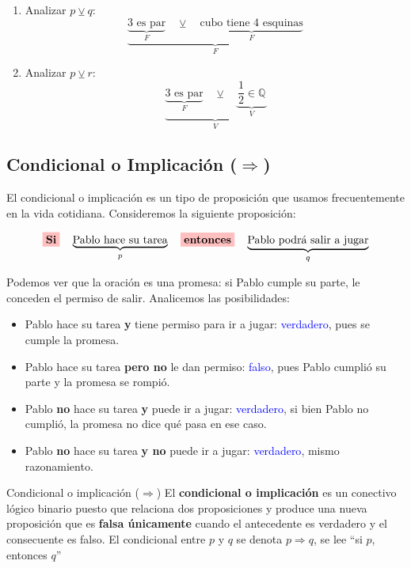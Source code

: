 \begin{enumerate}[label=\alph*)]
    \item Analizar $p \veebar q$:
    \[
    \underbrace{
        \underbrace{\text{3 es par}}_{F}
        \quad \veebar \quad
        \underbrace{\text{cubo tiene 4 esquinas}}_{F}
    }_{F}
    \]

    \item Analizar $p \veebar r$:
    \[
    \underbrace{
        \underbrace{\text{3 es par}}_{F}
        \quad \veebar \quad
        \underbrace{\dfrac{1}{2} \in \mathbb{Q}}_{V}
    }_{V}
    \]
\end{enumerate}

\subsection{\texorpdfstring{Condicional o Implicación ($\Rightarrow$)}{Condicional}}

El condicional o implicación es un tipo de proposición que usamos frecuentemente en la vida cotidiana. Consideremos la siguiente proposición:

\[
\colorbox{red!25}{\textbf{Si}}
\quad
\underbrace{\text{Pablo hace su tarea}}_{p}
\quad
\colorbox{red!25}{\textbf{entonces}}
\quad
\underbrace{\text{Pablo podrá salir a jugar}}_{q}
\]

Podemos ver que la oración es una promesa: si Pablo cumple su parte, le conceden el permiso de salir. Analicemos las posibilidades:

\begin{itemize}
    \item Pablo hace su tarea \textbf{y} tiene permiso para ir a jugar: \textcolor{blue}{verdadero}, pues se cumple la promesa.
    \item Pablo hace su tarea \textbf{pero no} le dan permiso: \textcolor{blue}{falso}, pues Pablo cumplió su parte y la promesa se rompió.
    \item Pablo \textbf{no} hace su tarea \textbf{y} puede ir a jugar: \textcolor{blue}{verdadero}, si bien Pablo no cumplió, la promesa no dice qué pasa en ese caso.
    \item Pablo \textbf{no} hace su tarea \textbf{y no} puede ir a jugar: \textcolor{blue}{verdadero}, mismo razonamiento.
\end{itemize}

\begin{dfn}{Condicional o implicación ($\Rightarrow$)}
    El \textbf{condicional o implicación} es un conectivo lógico binario puesto que relaciona dos proposiciones y produce una nueva proposición que es \textbf{falsa únicamente} cuando el antecedente es verdadero y el consecuente es falso. El condicional entre $p$ y $q$ se denota $p \Rightarrow q$, se lee ``si $p$, entonces $q$''
\end{dfn}


